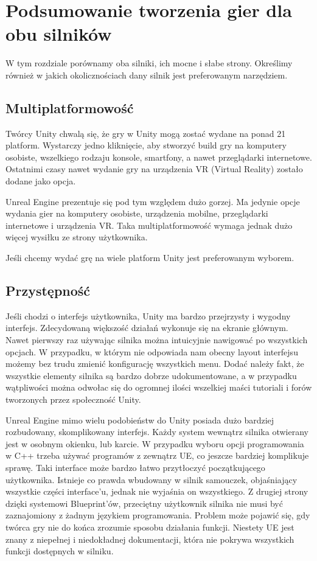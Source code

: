 \documentclass[brudnopis]{xmgr}
\begin{document}
\chapter{Podsumowanie tworzenia gier dla obu silników}

W tym rozdziale porównamy  oba silniki, ich mocne i słabe strony. Określimy również w jakich okolicznościach dany silnik jest preferowanym narzędziem.

\section{Multiplatformowość}

Twórcy Unity chwalą się, że gry w Unity mogą zostać wydane na ponad 21 platform. Wystarczy jedno kliknięcie, aby stworzyć build gry na komputery osobiste, wszelkiego rodzaju konsole, smartfony, a nawet przeglądarki internetowe. Ostatnimi czasy nawet wydanie gry na urządzenia VR (Virtual Reality) zostało dodane jako opcja.

Unreal Engine prezentuje się pod tym względem dużo gorzej. Ma jedynie opcje wydania gier na komputery osobiste, urządzenia mobilne, przeglądarki internetowe i urządzenia VR. Taka multiplatformowość wymaga jednak dużo więcej wysiłku ze strony użytkownika.

Jeśli chcemy wydać grę na wiele platform Unity jest preferowanym wyborem.

\section{Przystępność}

Jeśli chodzi o interfejs użytkownika, Unity ma bardzo przejrzysty i wygodny interfejs. Zdecydowaną większość działań wykonuje się na ekranie głównym. Nawet pierwszy raz używając silnika można intuicyjnie nawigować po wszystkich opcjach.
W przypadku, w którym nie odpowiada nam obecny layout interfejsu możemy bez trudu zmienić konfigurację wszystkich menu.
Dodać należy fakt, że wszystkie elementy silnika są bardzo dobrze udokumentowane, a w przypadku wątpliwości można odwołac się do ogromnej ilości wszelkiej maści tutoriali i forów tworzonych przez społeczność Unity.

Unreal Engine mimo wielu podobieństw do Unity posiada dużo bardziej rozbudowany, skomplikowany interfejs. Każdy system wewnątrz silnika otwierany jest w osobnym okienku, lub karcie. W przypadku wyboru opcji programowania w C++ trzeba używać programów z zewnątrz UE, co jeszcze bardziej komplikuje sprawę. Taki interface może bardzo łatwo przytłoczyć początkującego użytkownika. Istnieje co prawda wbudowany w silnik samouczek, objaśniający wszystkie części interface’u, jednak nie wyjaśnia on wszystkiego.
Z drugiej strony dzięki systemowi Blueprint’ów, przeciętny użytkownik silnika nie musi być zaznajomiony z żadnym językiem programowania.
Problem może pojawić się, gdy twórca gry nie do końca zrozumie sposobu działania funkcji. Niestety UE jest znany z niepełnej i niedokładnej dokumentacji, która nie pokrywa wszystkich funkcji dostępnych w silniku.
\end{document}

